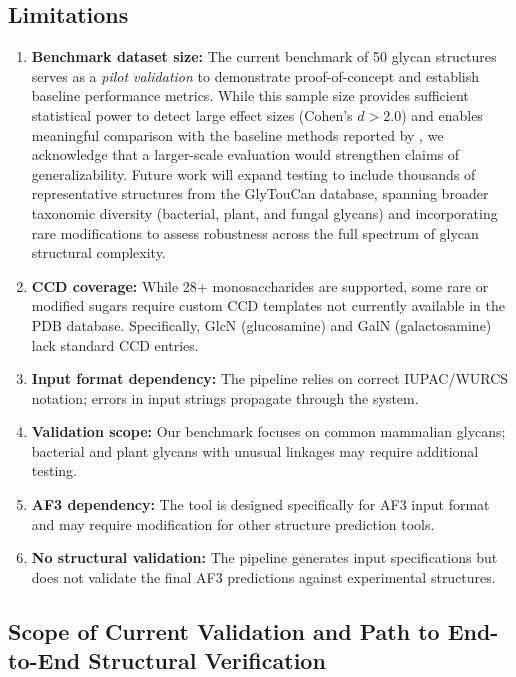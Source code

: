 \subsection{Limitations}

\begin{enumerate}
\item \textbf{Benchmark dataset size:} The current benchmark of 50 glycan structures serves as a \textit{pilot validation} to demonstrate proof-of-concept and establish baseline performance metrics. While this sample size provides sufficient statistical power to detect large effect sizes (Cohen's $d > 2.0$) and enables meaningful comparison with the baseline methods reported by \citet{huang2025}, we acknowledge that a larger-scale evaluation would strengthen claims of generalizability. Future work will expand testing to include thousands of representative structures from the GlyTouCan database, spanning broader taxonomic diversity (bacterial, plant, and fungal glycans) and incorporating rare modifications to assess robustness across the full spectrum of glycan structural complexity.

\item \textbf{CCD coverage:} While 28+ monosaccharides are supported, some rare or modified sugars require custom CCD templates not currently available in the PDB database. Specifically, GlcN (glucosamine) and GalN (galactosamine) lack standard CCD entries.

\item \textbf{Input format dependency:} The pipeline relies on correct IUPAC/WURCS notation; errors in input strings propagate through the system.

\item \textbf{Validation scope:} Our benchmark focuses on common mammalian glycans; bacterial and plant glycans with unusual linkages may require additional testing.

\item \textbf{AF3 dependency:} The tool is designed specifically for AF3 input format and may require modification for other structure prediction tools.

\item \textbf{No structural validation:} The pipeline generates input specifications but does not validate the final AF3 predictions against experimental structures.
\end{enumerate}

\subsection{Scope of Current Validation and Path to End-to-End Structural Verification}

